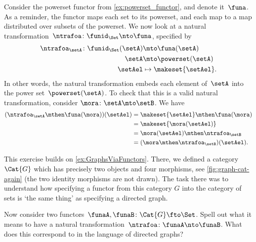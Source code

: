 \begin{example}
    Consider the powerset functor from \cref{ex:powerset_functor}, and denote it~$\funa$.
    As a reminder, the functor maps each set to its powerset, and each map to a map distributed over subsets of the powerset.
    We now look at a natural transformation~$\ntrafoa\colon \funid_\Set \nto \funa$, specified by
    \begin{equation}
        \begin{aligned}
            \ntrafoa_\setA\colon \funid_\Set(\setA) & \mto \funa(\setA) \\
            \setA                                   & \mto \powerset(\setA) \\
            \setAel                                 & \mapsto \makeset{\setAel}.
        \end{aligned}
    \end{equation}
    In other words, the natural transformation embeds each element of~$\setA$ into the power set~$\powerset(\setA)$.
    To check that this is a valid natural transformation, consider $\mora\colon \setA\mto \setB$.
    We have
    \begin{equation}
        \begin{aligned}
            (\ntrafoa_\setA \mthen \funa(\mora))(\setAel)
             & =\makeset{\setAel} \mthen \funa(\mora) \\
             & =\makeset{\mora(\setAel)} \\
             & =\mora(\setAel)\mthen \ntrafoa_\setB \\
             & =(\mora \mthen \ntrafoa_\setB)(\setAel).
        \end{aligned}
    \end{equation}
\end{example}

\vfill

\begin{marginfigure}
    \centering
    \caption{}
    \label{fig:graph-cat-again}
\end{marginfigure}
\begin{gradedexercise}
    \label{ex:NatTrafosGraphs}
    This exercise builds on \cref{ex:GraphsViaFunctors}.
    There, we defined a category~$\Cat{G}$ which has precisely two objects and four morphisms, see \cref{fig:graph-cat-again} (the two identity morphisms are not drawn).
    The task there was to understand how specifying a functor from this category $G$ into the category of sets is `the same thing' as specifying a directed graph.

    Now consider two functors~$\funaA, \funaB \colon \Cat{G} \fto \Set$.
    Spell out what it means to have a natural transformation~$\ntrafoa\colon \funaA \nto \funaB$.
    What does this correspond to in the language of directed graphs?
\end{gradedexercise}

